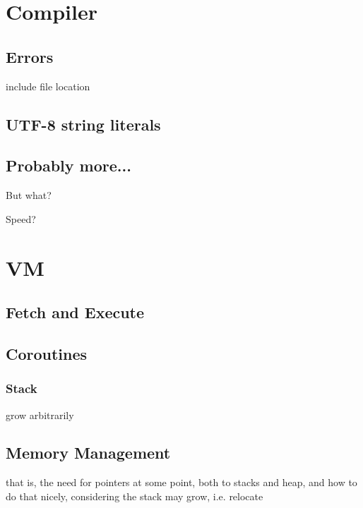     
    \section{Compiler}
        
        \subsection{Errors}
            
            include file location
            
        \subsection{UTF-8 string literals}
            
        \subsection{Probably more...}
            
            But what?
            
            Speed?
        
    \section{VM}
        
        \subsection{Fetch and Execute}
            
        \subsection{Coroutines}
            
            \subsubsection{Stack}
                
                grow arbitrarily
            
        \subsection{Memory Management}
            
            that is, the need for pointers at some point, both to stacks and heap, and how to do that nicely, considering the stack may grow, i.e. relocate
    
